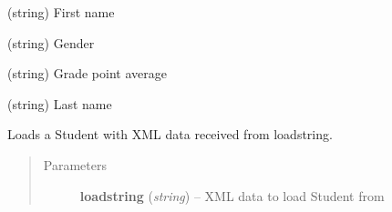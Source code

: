 \documentclass[letterpaper,10pt,english]{sphinxmanual}
\begin{document}
\begin{fulllineitems}
\begin{fulllineitems}
\begin{quote}
\begin{description}
\end{description}\end{quote}

\end{fulllineitems}


\begin{fulllineitems}
\label{index:ps.Student.first_name}
(string) First name

\end{fulllineitems}


\begin{fulllineitems}
\label{index:ps.Student.gender}
(string) Gender

\end{fulllineitems}


\begin{fulllineitems}
\label{index:ps.Student.gpa}
(string) Grade point average

\end{fulllineitems}


\begin{fulllineitems}
\label{index:ps.Student.last_name}
(string) Last name

\end{fulllineitems}


\begin{fulllineitems}
\label{index:ps.Student.load}
Loads a Student with XML data received from loadstring.
\begin{quote}\begin{description}
\item[{Parameters}] \leavevmode
\textbf{loadstring} (\emph{string}) -- XML data to load Student from

\end{description}\end{quote}

\end{fulllineitems}


\end{fulllineitems}
\end{document}

